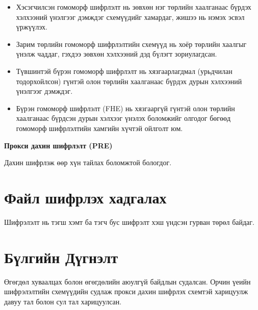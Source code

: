 \begin{itemize}
    \item Хэсэгчилсэн гомоморф шифрлэлт нь зөвхөн нэг төрлийн хаалганаас бүрдэх хэлхээний үнэлгээг дэмждэг схемүүдийг хамардаг, жишээ нь нэмэх эсвэл үржүүлэх.
    \item Зарим төрлийн гомоморф шифрлэлтийн схемүүд нь хоёр төрлийн хаалгыг үнэлж чаддаг, гэхдээ зөвхөн хэлхээний дэд бүлэгт зориулагдсан.
    \item Түвшинтэй бүрэн гомоморф шифрлэлт нь хязгаарлагдмал (урьдчилан тодорхойлсон) гүнтэй олон төрлийн хаалганаас бүрдэх дурын хэлхээний үнэлгээг дэмждэг.
    \item Бүрэн гомоморф шифрлэлт (FHE) нь хязгааргүй гүнтэй олон төрлийн хаалганаас бүрдсэн дурын хэлхээг үнэлэх боломжийг олгодог бөгөөд гомоморф шифрлэлтийн хамгийн хүчтэй ойлголт юм.
\end{itemize}


\textbf{Прокси дахин шифрлэлт (PRE)}

Дахин шифрлэж өөр хүн тайлах боломжтой бологдог.


\section{Файл шифрлэх хадгалах}

Шифрэлэлт нь тэгш хэмт ба тэгч бус шифрэлт хэш үндсэн гурван төрөл байдаг. 



\section{Бүлгийн Дүгнэлт}

Өгөгдөл хуваалцах болон өгөгдөлийн аюулгүй байдлын судалсан. Орчин үеийн шифрэлэлтийн схемүүдийн судлаж прокси дахин шифрлэх схемтэй харицуулж давуу тал болон сул тал харицуулсан.